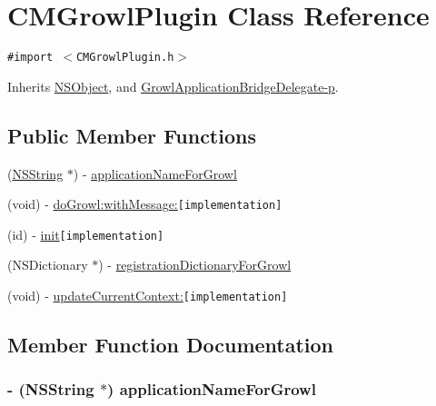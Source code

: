 \hypertarget{interface_c_m_growl_plugin}{
\section{CMGrowlPlugin Class Reference}
\label{interface_c_m_growl_plugin}
}
{\tt \#import $<$CMGrowlPlugin.h$>$}

Inherits \hyperlink{class_n_s_object}{NSObject}, and \hyperlink{class_growl_application_bridge_delegate-p}{GrowlApplicationBridgeDelegate-p}.

\subsection*{Public Member Functions}
\begin{CompactItemize}
\item 
(\hyperlink{class_n_s_string}{NSString} $\ast$) - \hyperlink{interface_c_m_growl_plugin_502bc9cd4cd1feccab8e8f139369bf6e}{applicationNameForGrowl}
\item 
(void) - \hyperlink{interface_c_m_growl_plugin_3b447261269246d5b5c62f9da6fe4400}{doGrowl:withMessage:}{\tt  \mbox{[}implementation\mbox{]}}
\item 
(id) - \hyperlink{interface_c_m_growl_plugin_43466117017daa5170e3b58504289d55}{init}{\tt  \mbox{[}implementation\mbox{]}}
\item 
(NSDictionary $\ast$) - \hyperlink{interface_c_m_growl_plugin_31184d5a2ea52bf2de3b1cf05a4c7a4c}{registrationDictionaryForGrowl}
\item 
(void) - \hyperlink{interface_c_m_growl_plugin_e9890e209bd409c76a2cbcfe07f1a835}{updateCurrentContext:}{\tt  \mbox{[}implementation\mbox{]}}
\end{CompactItemize}


\subsection{Member Function Documentation}
\hypertarget{interface_c_m_growl_plugin_502bc9cd4cd1feccab8e8f139369bf6e}{
\subsubsection[applicationNameForGrowl]{\setlength{\rightskip}{0pt plus 5cm}- ({\bf NSString} $\ast$) applicationNameForGrowl }}
\label{interface_c_m_growl_plugin_502bc9cd4cd1feccab8e8f139369bf6e}


